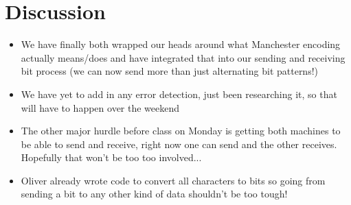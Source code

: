\documentclass{article}
\begin{document}
\section*{Discussion}
\begin{itemize}
\item We have finally both wrapped our heads around what Manchester encoding actually means/does and have integrated that into our sending and receiving bit process (we can now send more than just alternating bit patterns!)
\item We have yet to add in any error detection, just been researching it, so that will have to happen over the weekend
\item The other major hurdle before class on Monday is getting both machines to be able to send and receive, right now one can send and the other receives. Hopefully that won't be too too involved...
\item Oliver already wrote code to convert all characters to bits so going from sending a bit to any other kind of data shouldn't be too tough!
\end{itemize}
\end{document}

